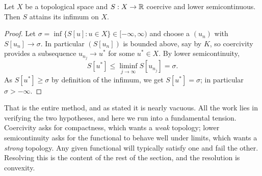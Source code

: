 \documentclass[a4paper]{scrartcl}
\begin{document}
\begin{center}
\end{center}

\begin{theorem}\label{thm:directabstract}
	Let $X$ be a topological space and $S : X \to \mathbb{R}$ coercive and lower semicontinuous. Then $S$ attains its infimum on $X$.
\end{theorem}

\begin{proof}
	Let $\sigma = \inf\{S[u] : u \in X\} \in [-\infty,\infty)$ and choose a  $(u_n)$ with $S[u_n]\to\sigma$. In particular $(S[u_n])$ is bounded above, say by $K$, so coercivity provides a subsequence $u_{n_j}\to u^*$ for some $u^*\in X$. By lower semicontinuity,
	$$S[u^*]\le \liminf_{j\to\infty}S[u_{n_j}] = \sigma.$$
	As $S[u^*]\ge\sigma$ by definition of the infimum, we get $S[u^*] = \sigma$; in particular $\sigma > -\infty$.
\end{proof}

That is the entire method, and as stated it is nearly vacuous. All the work lies in verifying the two hypotheses, and here we run into a fundamental tension. Coercivity asks for compactness, which wants a \emph{weak} topology; lower semicontinuity asks for the functional to behave well under limits, which wants a \emph{strong} topology. Any given functional will typically satisfy one and fail the other. Resolving this is the content of the rest of the section, and the resolution is convexity.
\end{document}
